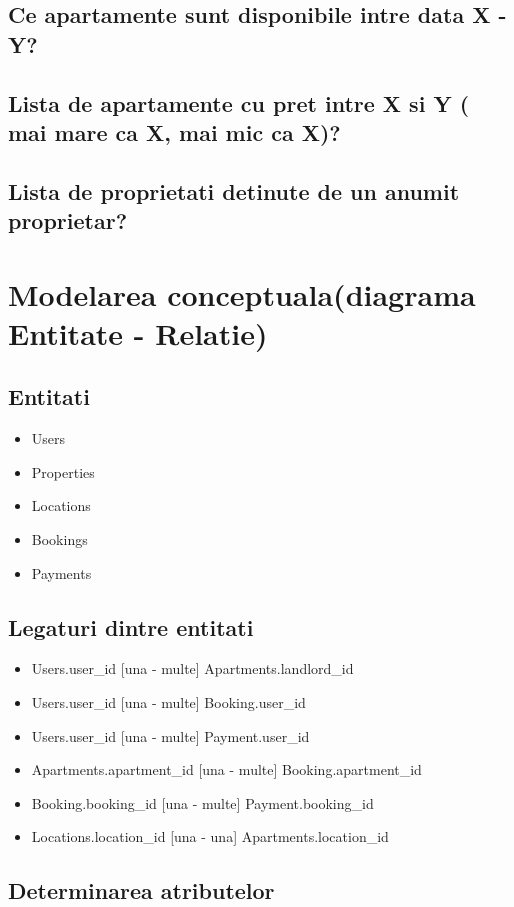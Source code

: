 \documentclass[12pt]{article} %
\begin{document}
\subsection {Ce apartamente sunt disponibile intre data X - Y?}
\subsection {Lista de apartamente cu pret intre X si Y ( mai mare ca X, mai mic ca X)?}
\subsection {Lista de proprietati detinute de un anumit proprietar?}

\section{Modelarea conceptuala(diagrama Entitate - Relatie)}
\subsection {Entitati}
\begin{itemize}
\item Users
\item Properties
\item Locations
\item Bookings
\item Payments
\end{itemize}

\subsection {Legaturi dintre entitati}
\begin{itemize}
\item Users.user\_id [una - multe] Apartments.landlord\_id
\item Users.user\_id [una - multe] Booking.user\_id
\item Users.user\_id [una - multe] Payment.user\_id
\item Apartments.apartment\_id [una - multe] Booking.apartment\_id
\item Booking.booking\_id [una - multe] Payment.booking\_id
\item Locations.location\_id [una - una] Apartments.location\_id
\end{itemize}
\subsection {Determinarea atributelor}
\end{document}
